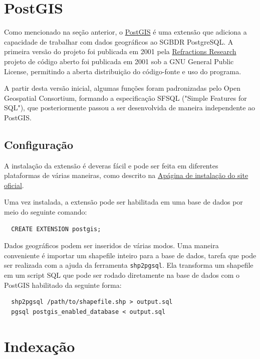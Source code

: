 \documentclass[12pt]{article}
\begin{document}
\section{PostGIS} \label{sec:firstpage}

Como mencionado na seção anterior, o \href{http://postgis.net}{PostGIS} é uma
extensão que adiciona a capacidade de trabalhar com dados geográficos ao SGBDR
PostgreSQL. A primeira versão do projeto foi publicada em 2001 pela
\href{http://refractions.net}{Refractions Research} projeto de código aberto
foi publicada em 2001 sob a GNU General Public License, permitindo a aberta
distribuição do código-fonte e uso do programa.

A partir desta versão inicial, algumas funções foram padronizadas pelo Open
Geospatial Consortium, formando a especificação SFSQL ("Simple Features for
SQL"), que posteriormente passou a ser desenvolvida de maneira independente ao
PostGIS.

\subsection{Configuração}

A instalação da extensão é deveras fácil e pode ser feita em diferentes
plataformas de várias maneiras, como descrito na
\href{http://postgis.net/install}{Apágina de instalação do site oficial}.

Uma vez instalada, a extensão pode ser habilitada em uma base de dados por meio
do seguinte comando:

\begin{verbatim}
  CREATE EXTENSION postgis;
\end{verbatim}

Dados geográficos podem ser inseridos de várias modos. Uma maneira conveniente
é importar um shapefile inteiro para a base de dados, tarefa que pode ser
realizada com a ajuda da ferramenta \texttt{shp2pgsql}. Ela transforma um
shapefile em um script SQL que pode ser rodado diretamente na base de dados com
o PostGIS habilitado da seguinte forma:

\begin{verbatim}
  shp2pgsql /path/to/shapefile.shp > output.sql
  pgsql postgis_enabled_database < output.sql
\end{verbatim}

\section{Indexação}
\end{document}

